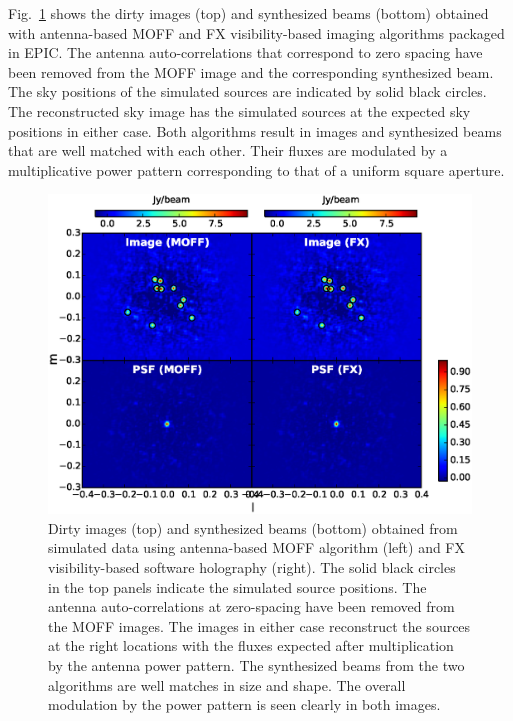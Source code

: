 \documentclass[a4paper,fleqn,usenatbib]{../mnras}
\begin{document}
Fig.~\ref{fig:MOFF-FX-image} shows the dirty images (top) and synthesized beams
(bottom) obtained with antenna-based MOFF and FX visibility-based imaging 
algorithms packaged in EPIC. The antenna auto-correlations that correspond to 
zero spacing have been removed from the MOFF image and the corresponding 
synthesized beam. The sky positions of the simulated sources are indicated by 
solid black circles. The reconstructed sky image has the simulated sources at the
expected sky positions in either case. Both algorithms result in images and 
synthesized beams that are well matched with each other. Their fluxes are 
modulated by a multiplicative power pattern corresponding to that of a uniform
square aperture. 

\begin{figure}
  \includegraphics[width=\columnwidth]{MOFF_FX_image_comparison.eps}
  \caption{Dirty images (top) and synthesized beams (bottom) obtained from 
    simulated data using antenna-based MOFF algorithm (left) and FX 
    visibility-based software holography (right). The solid black circles in the
    top panels indicate the simulated source positions. The antenna 
    auto-correlations at zero-spacing have been removed from the MOFF images. 
    The images in either case reconstruct the sources at the right locations 
    with the fluxes expected after multiplication by the antenna power pattern. 
    The synthesized beams from the two algorithms are well matches in size and
    shape. The overall modulation by the power pattern is seen clearly in both
    images.}
  \label{fig:MOFF-FX-image}
\end{figure}
\end{document}

